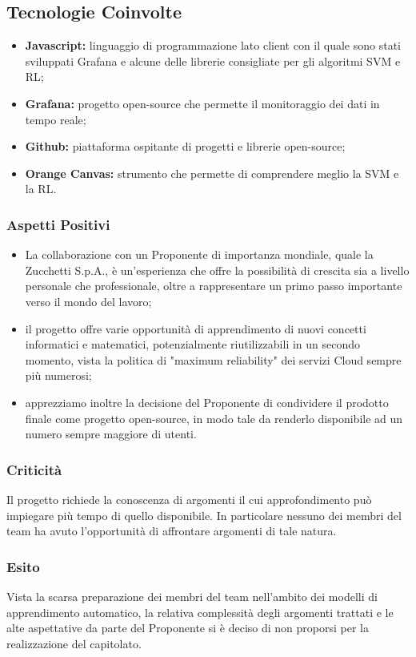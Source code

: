 	\subsection{Tecnologie Coinvolte}
	\begin{itemize}
		\item \textbf{Javascript}\textbf{:} linguaggio di programmazione lato client con il quale sono stati sviluppati Grafana e alcune delle librerie consigliate per gli algoritmi SVM e RL; 
		\item \textbf{Grafana}\textbf{:} progetto open-source che permette il monitoraggio dei dati in tempo reale;
		\item \textbf{Github}\textbf{:} piattaforma ospitante di progetti e librerie open-source;
		\item \textbf{Orange Canvas}\textbf{:} strumento che permette di comprendere meglio la SVM e la RL.
	\end{itemize}
	
	\subsubsection{Aspetti Positivi}
	\begin{itemize}
		\item La collaborazione con un Proponente di importanza mondiale, quale la Zucchetti S.p.A., è un'esperienza che offre la possibilità di crescita sia a livello personale che professionale, oltre a rappresentare un primo passo importante verso il mondo del lavoro; 
		\item il progetto offre varie opportunità di apprendimento di nuovi concetti informatici e matematici, potenzialmente riutilizzabili in un secondo momento, vista la politica di "maximum reliability" dei servizi Cloud sempre più numerosi; 
		\item apprezziamo inoltre la decisione del Proponente di condividere il prodotto finale come progetto open-source, in modo tale da renderlo disponibile ad un numero sempre maggiore di utenti.
	\end{itemize}

	\subsubsection{Criticità}
		Il progetto richiede la conoscenza di argomenti il cui approfondimento può impiegare più tempo di quello disponibile. In particolare nessuno dei membri del team ha avuto l'opportunità di affrontare argomenti di tale natura.
	
	\subsubsection{Esito}
		Vista la scarsa preparazione dei membri del team nell'ambito dei modelli di apprendimento automatico, la relativa complessità degli argomenti trattati e le alte aspettative da parte del Proponente si è deciso di non proporsi per la realizzazione del capitolato.